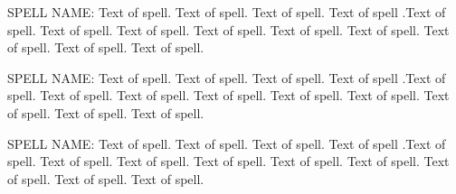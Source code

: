 \documentclass[10pt,oneside,a4paper,landscape]{memoir}
\begin{document}
\begin{Form}
\begin{multicols}{4}
\columnbreak

{}

\begin{minipage}{\columnwidth}
\CheckBox[height=1.5ex,width=1.5ex, name=sp5a, bordercolor=]{} SPELL NAME: Text of spell. Text of spell. Text of spell. Text of spell .Text of spell. Text of spell. Text of spell. Text of spell. Text of spell. Text of spell. Text of spell. Text of spell. Text of spell.
\end{minipage}

\columnbreak

{}

\begin{minipage}{\columnwidth}
\CheckBox[height=1.5ex,width=1.5ex, name=sp7a, bordercolor=]{} SPELL NAME: Text of spell. Text of spell. Text of spell. Text of spell .Text of spell. Text of spell. Text of spell. Text of spell. Text of spell. Text of spell. Text of spell. Text of spell. Text of spell.
\end{minipage}

{}

\begin{minipage}{\columnwidth}
\CheckBox[height=1.5ex,width=1.5ex, name=sp9a, bordercolor=]{} SPELL NAME: Text of spell. Text of spell. Text of spell. Text of spell .Text of spell. Text of spell. Text of spell. Text of spell. Text of spell. Text of spell. Text of spell. Text of spell. Text of spell.
\end{minipage}

\end{multicols}

\end{Form}
\end{document}

